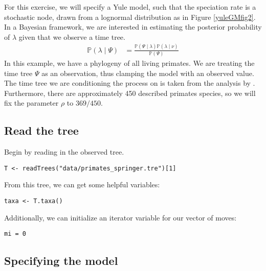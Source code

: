 For this exercise, we will specify a Yule model, such that the speciation rate is a stochastic node, drawn from a lognormal distribution as in Figure \ref{yuleGMfig2}.
In a Bayesian framework, we are interested in estimating the posterior probability of $\lambda$ given that we observe a time tree.
\begin{align}\label{bayesTher}
\mathbb{P}(\lambda \mid \Psi) &= \frac{\mathbb{P}(\Psi \mid \lambda)\mathbb{P}(\lambda \mid \nu)}{\mathbb{P}(\Psi)}
\end{align}
In this example, we have a phylogeny of all living primates. 
We are treating the time tree $\Psi$ as an observation, thus clamping the model with an observed value.
The time tree we are conditioning the process on is taken from the analysis by \citet{Springer2012}.
Furthermore, there are approximately 450 described primates species, so we will fix the parameter $\rho$ to $369/450$.



\subsection{Read the tree}

Begin by reading in the observed tree. 

{\tt \begin{snugshade*}
\begin{lstlisting}
T <- readTrees("data/primates_springer.tre")[1]
\end{lstlisting}
\end{snugshade*}}

From this tree, we can get some helpful variables:
{\tt \begin{snugshade*}
\begin{lstlisting}
taxa <- T.taxa()
\end{lstlisting}
\end{snugshade*}}

Additionally, we can initialize an iterator variable for our vector of moves:
{\tt \begin{snugshade*}
\begin{lstlisting}
mi = 0
\end{lstlisting}
\end{snugshade*}}


\subsection{Specifying the model}

